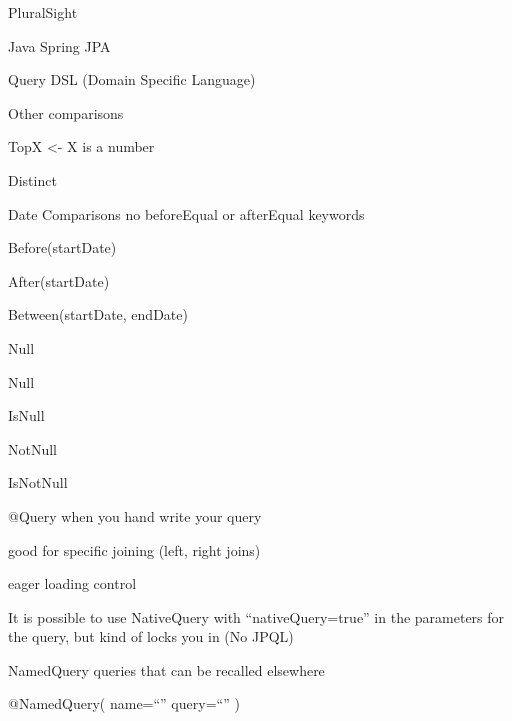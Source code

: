 \documentclass[presentation]{beamer}
\begin{document}
\begin{frame}[label={sec:org34d6546}]{PluralSight}
\begin{block}{Java Spring JPA}
\begin{block}{Query DSL (Domain Specific Language)}
\begin{block}{Other comparisons}
\begin{block}{TopX <- X is a number}
\end{block}
\begin{block}{Distinct}
\end{block}
\end{block}
\begin{block}{Date Comparisons}
no beforeEqual or afterEqual keywords
\begin{block}{Before(startDate)}
\end{block}
\begin{block}{After(startDate)}
\end{block}
\begin{block}{Between(startDate, endDate)}
\end{block}
\end{block}
\begin{block}{Null}
\begin{block}{Null}
\end{block}
\begin{block}{IsNull}
\end{block}
\begin{block}{NotNull}
\end{block}
\begin{block}{IsNotNull}
\end{block}
\end{block}
\end{block}
\begin{block}{@Query}
when you hand write your query
\begin{block}{good for specific joining (left, right joins)}
\end{block}
\begin{block}{eager loading control}
\end{block}

\begin{block}{It is possible to use NativeQuery with ``nativeQuery=true'' in the parameters for the query, but kind of locks you in (No JPQL)}
\end{block}
\begin{block}{NamedQuery}
queries that can be recalled elsewhere

@NamedQuery(
    name=``''
    query=``''
)
\end{block}
\end{block}
\end{block}


\end{frame}
\end{document}
